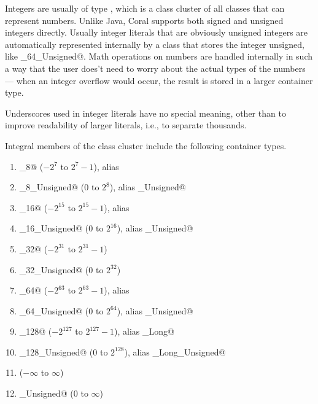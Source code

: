 Integers are usually of type \lstinline@Number@, which is a class cluster of all classes that can represent numbers. Unlike Java, Coral supports both signed and unsigned integers directly. Usually integer literals that are obviously unsigned integers are automatically represented internally by a class that stores the integer unsigned, like \lstinline@Integer_64_Unsigned@. Math operations on numbers are handled internally in such a way that the user does't need to worry about the actual types of the numbers — when an integer overflow would occur, the result is stored in a larger container type. 

Underscores used in integer literals have no special meaning, other than to improve readability of larger literals, i.e., to separate thousands.

Integral members of the \lstinline@Number@ class cluster include the following container types. 

\begin{enumerate}

\item \lstinline@Integer_8@ ($-2^{7}$ to $2^{7}-1$), alias \lstinline@Byte@

\item \lstinline@Integer_8_Unsigned@ ($0$ to $2^{8}$), alias \lstinline@Byte_Unsigned@

\item \lstinline@Integer_16@ ($-2^{15}$ to $2^{15}-1$), alias \lstinline@Short@

\item \lstinline@Integer_16_Unsigned@ ($0$ to $2^{16}$), alias \lstinline@Short_Unsigned@

\item \lstinline@Integer_32@ ($-2^{31}$ to $2^{31}-1$)

\item \lstinline@Integer_32_Unsigned@ ($0$ to $2^{32}$)

\item \lstinline@Integer_64@ ($-2^{63}$ to $2^{63}-1$), alias \lstinline@Long@

\item \lstinline@Integer_64_Unsigned@ ($0$ to $2^{64}$), alias \lstinline@Long_Unsigned@

\item \lstinline@Integer_128@ ($-2^{127}$ to $2^{127}-1$), alias \lstinline@Double_Long@

\item \lstinline@Integer_128_Unsigned@ ($0$ to $2^{128}$), alias \lstinline@Double_Long_Unsigned@

\item \lstinline@Decimal@ ($-\infty$ to $\infty$)

\item \lstinline@Decimal_Unsigned@ ($0$ to $\infty$)

\end{enumerate}

